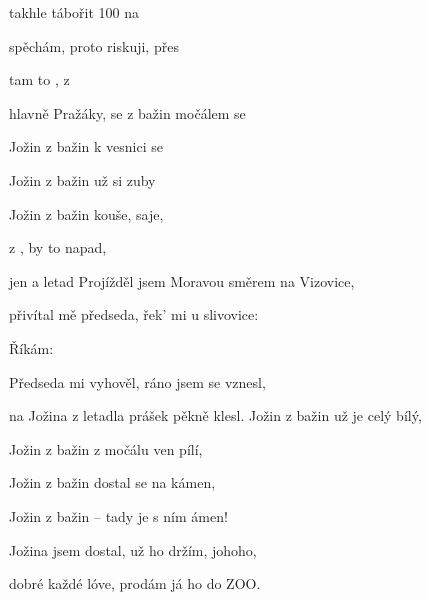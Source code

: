
\zs
{} takhle tábořit  100 na 

spěchám, proto riskuji,  přes 

 tam to ,  z 

 hlavně Pražáky,  se 
\ks
\zr
{} z bažin močálem se 

Jožin z bažin k vesnici se 

Jožin z bažin už si zuby 

Jožin z bažin kouše, saje, 

 z ,  by to napad,

 jen a   letad 
\kr
\zs
Projížděl jsem Moravou směrem na Vizovice,

přivítal mě předseda, řek' mi u slivovice:

\ks
\zr  \kr
\zs
Říkám: 

Předseda mi vyhověl, ráno jsem se vznesl,

na Jožina z letadla prášek pěkně klesl.
\ks
\zr
Jožin z bažin už je celý bílý,

Jožin z bažin z močálu ven pílí,

Jožin z bažin dostal se na kámen,

Jožin z bažin -- tady je s ním ámen!

Jožina jsem dostal, už ho držím, johoho,

dobré každé lóve, prodám já ho do ZOO.
\kr
\kp






